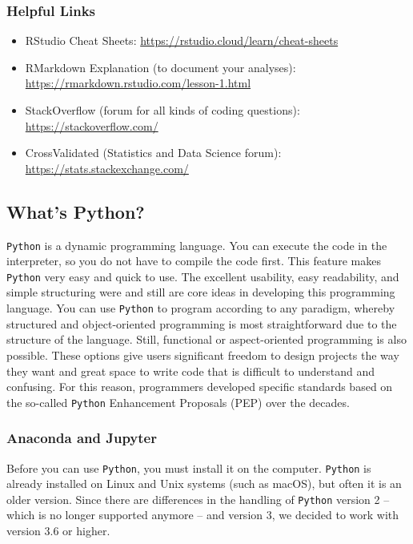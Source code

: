 \documentclass[
  11pt,
]{article}
\providecommand{\tightlist}{%
  \setlength{\itemsep}{0pt}\setlength{\parskip}{0pt}}
\begin{document}
\hypertarget{helpful-links}{%
\subsubsection{Helpful Links}\label{helpful-links}}

\begin{itemize}
\tightlist
\item
  RStudio Cheat Sheets: \url{https://rstudio.cloud/learn/cheat-sheets}
\item
  RMarkdown Explanation (to document your analyses): \url{https://rmarkdown.rstudio.com/lesson-1.html}
\item
  StackOverflow (forum for all kinds of coding questions): \url{https://stackoverflow.com/}
\item
  CrossValidated (Statistics and Data Science forum): \url{https://stats.stackexchange.com/}
\end{itemize}

\hypertarget{whats-python}{%
\subsection{What's Python?}\label{whats-python}}

\texttt{Python} is a dynamic programming language. You can execute the code in the interpreter, so you do not have to compile the code first. This feature makes \texttt{Python} very easy and quick to use. The excellent usability, easy readability, and simple structuring were and still are core ideas in developing this programming language.
You can use \texttt{Python} to program according to any paradigm, whereby structured and object-oriented programming is most straightforward due to the structure of the language. Still, functional or aspect-oriented programming is also possible. These options give users significant freedom to design projects the way they want and great space to write code that is difficult to understand and confusing. For this reason, programmers developed specific standards based on the so-called \texttt{Python} Enhancement Proposals (PEP) over the decades.

\hypertarget{anaconda-and-jupyter}{%
\subsubsection{Anaconda and Jupyter}\label{anaconda-and-jupyter}}

Before you can use \texttt{Python}, you must install it on the computer. \texttt{Python} is already installed on Linux and Unix systems (such as macOS), but often it is an older version. Since there are differences in the handling of \texttt{Python} version 2 -- which is no longer supported anymore -- and version 3, we decided to work with version 3.6 or higher.
\end{document}

